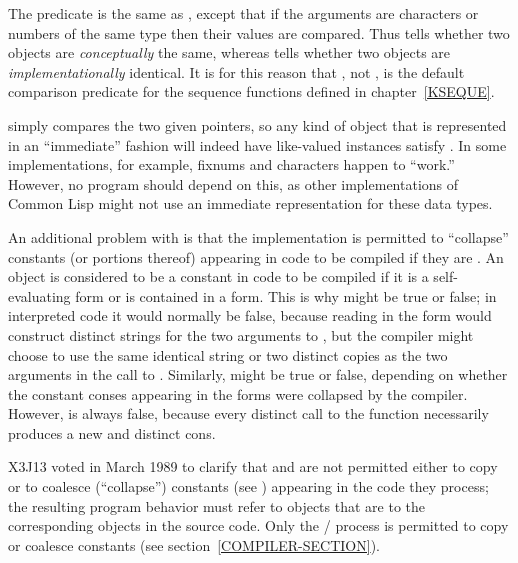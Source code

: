 \begin{defun}[Function]
The predicate  is the same as , except that if the
arguments are characters or numbers of the same type then their
values are compared.  Thus  tells whether two objects
are \emph{conceptually} the same, whereas  tells whether two
objects are \emph{implementationally} identical.  It is for this reason
that , not , is the default comparison predicate
for the sequence functions defined in chapter~\ref{KSEQUE}.

\beforenoterule
\begin{implementation}
 simply compares the two given pointers,
so any kind of object that is represented in an ``immediate'' fashion
will indeed have like-valued instances satisfy .
In some implementations, for example,
fixnums and characters happen to ``work.''
However, no program should depend on this, as other implementations
of Common Lisp might not use an immediate representation for these data types.
\end{implementation}
\afternoterule

\begin{obsolete}
An additional problem with  is that the implementation is permitted
to ``collapse'' constants (or portions thereof)
appearing in code to be compiled if they are
.  An object is considered to be a constant in code to be compiled
if it is a self-evaluating form or is contained in a  form.
This is why  might be true or false; in interpreted
code it would normally be false, because reading in the
form  would construct distinct strings for the two
arguments to , but the compiler might choose to use the same
identical string or two distinct copies as the two arguments in the
call to .  Similarly,  might be true
or false, depending on whether the constant conses appearing in the
 forms were collapsed by the compiler.  However,
 is always false, because every distinct
call to the  function necessarily produces a new and distinct cons.
\end{obsolete}

\begin{newer}
X3J13 voted in March 1989  to clarify that
 and  are not permitted either to copy or
to coalesce (``collapse'') constants (see )
appearing in the code they process; the resulting
program behavior must refer to objects that are  to the
corresponding objects in the source code.
Only the / process is permitted
to copy or coalesce constants (see section~\ref{COMPILER-SECTION}).
\end{newer}
\end{defun}

